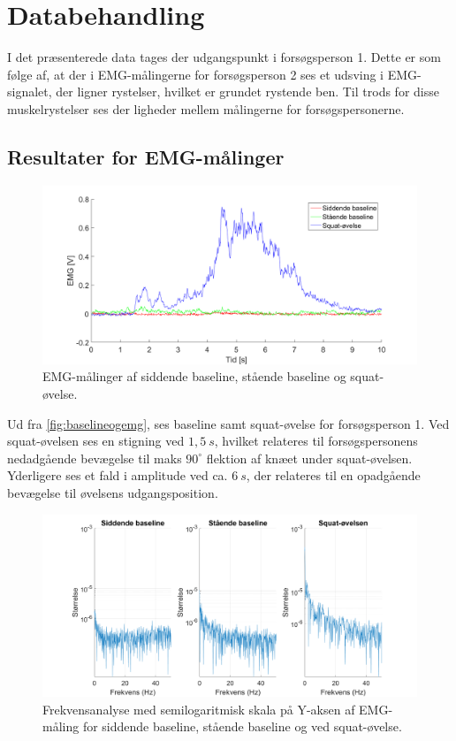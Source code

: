 \section{Databehandling}
I det præsenterede data tages der udgangspunkt i forsøgsperson 1. Dette er som følge af, at der i EMG-målingerne for forsøgsperson 2 ses et udsving i EMG-signalet, der ligner rystelser, hvilket er grundet rystende ben. Til trods for disse muskelrystelser ses der ligheder mellem målingerne for forsøgspersonerne. 

\subsection{Resultater for EMG-målinger}

\begin{figure}[H]
	\centering
	\includegraphics[width=1\textwidth]{figures/Pilotforsoeg/baselineogemg.png}
	\caption{EMG-målinger af siddende baseline, stående baseline og squat-øvelse.}
	\label{fig:baselineogemg}
\end{figure}
Ud fra \autoref{fig:baselineogemg}, ses baseline samt squat-øvelse for forsøgsperson 1. Ved squat-øvelsen ses en stigning ved $1,5~s$, hvilket relateres til forsøgspersonens nedadgående bevægelse til maks $90^{\circ}$ flektion af knæet under squat-øvelsen. Yderligere ses et fald i amplitude ved ca. $6~s$, der relateres til en opadgående bevægelse til øvelsens udgangsposition. 


\begin{figure}[H]
	\centering
	\includegraphics[width=1\textwidth]{figures/Pilotforsoeg/emgfft.png}
	\caption{Frekvensanalyse med semilogaritmisk skala på Y-aksen af EMG-måling for siddende baseline, stående baseline og ved squat-øvelse.}
	\label{fig:emgfft}
\end{figure}

